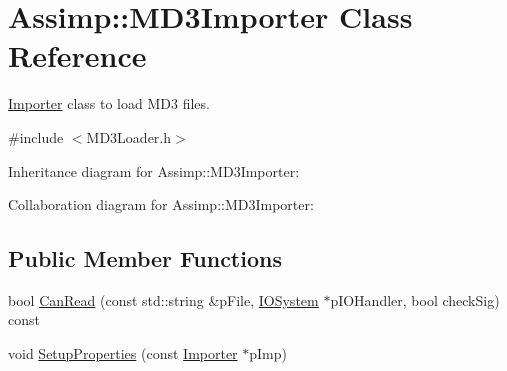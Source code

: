 \hypertarget{class_assimp_1_1_m_d3_importer}{\section{Assimp\+:\+:M\+D3\+Importer Class Reference}
\label{class_assimp_1_1_m_d3_importer}
}


\hyperlink{class_assimp_1_1_importer}{Importer} class to load M\+D3 files.  




{\ttfamily \#include $<$M\+D3\+Loader.\+h$>$}



Inheritance diagram for Assimp\+:\+:M\+D3\+Importer\+:


Collaboration diagram for Assimp\+:\+:M\+D3\+Importer\+:
\subsection*{Public Member Functions}
\begin{DoxyCompactItemize}
\item 
bool \hyperlink{class_assimp_1_1_m_d3_importer_a216411fbed007245dbd9a44b2ed0c5f8}{Can\+Read} (const std\+::string \&p\+File, \hyperlink{class_assimp_1_1_i_o_system}{I\+O\+System} $\ast$p\+I\+O\+Handler, bool check\+Sig) const 
\item 
void \hyperlink{class_assimp_1_1_m_d3_importer_a6e949a276c71016d1d5926ff76f13a86}{Setup\+Properties} (const \hyperlink{class_assimp_1_1_importer}{Importer} $\ast$p\+Imp)
\end{DoxyCompactItemize}
